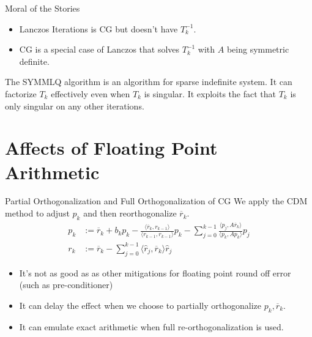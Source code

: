 \documentclass{beamer}
\begin{document}
    \begin{frame}{Moral of the Stories}
        \begin{itemize}
            \item Lanczos Iterations is CG but doesn't have $T_k^{-1}$. 
            \item CG is a special case of Lanczos that solves $T_k^{-1}$ with $A$ being symmetric definite.
        \end{itemize}
        The SYMMLQ algorithm is an algorithm for sparse indefinite system. It can factorize $T_k$ effectively even when $T_k$ is singular\cite{paper:SYMLQ}. It exploits the fact that $T_k$ is only singular on any other iterations\cite{paper:greenbaum_indefinite_lanczos}.
    \end{frame}
\section{Affects of Floating Point Arithmetic}
    \begin{frame}{Partial Orthogonalization and Full Orthogonalization of CG}
        We apply the CDM method to adjust $p_k$ and then reorthogonalize $\overline r_k$. 
        \begin{align}
            p_k &:= \overline{r}_k + b_kp_k - 
                \frac{\langle \overline{r}_k, r_{k -1}\rangle}{\langle r_{k - 1}, r_{k - 1}\rangle}p_k
            - \sum_{j = 0}^{k - 1}\frac{\langle p_j, A\overline{r}_k\rangle}{\langle p_k, Ap_k\rangle}p_j
            \\
            r_k &:= \overline{r}_k - \sum_{j = 0}^{k - 1} \langle \hat{r}_j,\overline{r}_k\rangle \hat{r}_j
        \end{align}
        \begin{itemize}
            \item It's not as good as as other mitigations for floating point round off error (such as pre-conditioner)
            \item It can delay the effect when we choose to partially orthogonalize $p_k, \overline r_k$. 
            \item It can emulate exact arithmetic when full re-orthogonalization is used. 
        \end{itemize}
    \end{frame}
\end{document}
